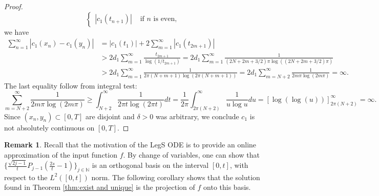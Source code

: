 \documentclass{article}
\theoremstyle{definition}
\newtheorem{remark}{Remark}[section]
\newcommand{\pr}[1]{ \left( #1 \right) }
\newcommand{\abs}[1]{\left| #1 \right|}
\begin{document}
\begin{proof}
\begin{equation*}
\begin{cases}
            \abs{c_1(t_{n+1})} & \text{ if $n$ is even}   ,
        \end{cases}
    \end{equation*}
    we have
    \begin{equation*}
        \begin{aligned}
            \sum_{n=1}^{\infty} \abs{ c_1(x_n) - c_1(y_{n}) } 
            &= \abs{c_1(t_1)} + 2\sum_{m=1}^{\infty} \abs{ c_1(t_{2m+1})} \\
            &> 2 d_1 \sum_{m=1}^{\infty} \frac{t_{2m+1}}{\log(1/t_{2m+1})} %
            = 2 d_1 \sum_{m=1}^{\infty} \frac{1}{ 
(2N + 2m + 3/2)\pi \log((2N + 2m + 3/2)\pi)} \\
            &> 2 d_1 \sum_{m=1}^{\infty} \frac{1}{ 
2\pi(N + m + 1) \log(2\pi(N + m + 1))} 
            = 2 d_1 \sum_{m=N+2}^{\infty} \frac{1}{ 
            2m\pi \log(2m\pi)} 
            = \infty.
        \end{aligned}
    \end{equation*}
    The last equality follow from integral test:
    \begin{equation*}
        \sum_{m=N+2}^{\infty} \frac{1}{ 
            2m\pi \log(2m\pi)}
        \ge \int_{N+2}^{\infty} \frac{1}{2\pi t \log (2\pi t)} dt
        = \frac{1}{2\pi} \int_{2\pi(N+2)}^{\infty} \frac{1}{u \log u} du 
        = [\log(\log(u))]_{2\pi(N+2)}^{\infty}
        = \infty. 
    \end{equation*}
    Since $(x_n,y_n) \subset [0,T]$ are disjoint and $\delta>0$ was arbitrary, we conclude $c_1$ is not absolutely continuous on $[0,T]$.
\end{proof}




\begin{remark}
   Recall that the motivation of the LegS ODE is to provide an online approximation of the input function $f$. 
   By change of variables, one can show that $\{ \frac{\sqrt{2j-1}}{t} P_{j-1}\pr{\frac{2s}{t} -1} \}_{j \in \mathbb{N}}$ is an orthogonal basis on the interval $[0, t]$, with respect to the $L^2([0,t])$ norm. 
    The following corollary shows that the solution found in Theorem \ref{thm:exist and unique} is the projection of $f$ onto this basis.
\end{remark}
\end{document}
